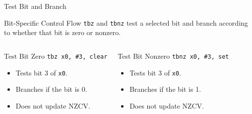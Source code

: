 \documentclass[aspectratio=169,11pt,t]{beamer}
\newcommand{\code}[1]{\texttt{#1}}
\begin{document}
\begin{frame}{Test Bit and Branch}
\begin{block}{Bit-Specific Control Flow}
\code{tbz} and \code{tbnz} test a selected bit and branch according to whether that bit is zero or nonzero.
\end{block}
\vspace{0.2cm}
\begin{columns}[T,onlytextwidth]
\begin{block}{Test Bit Zero}
\large
\hspace{1.1cm}\code{tbz x0, \#3, clear}
\normalsize
\begin{itemize}
\item Tests bit 3 of \code{x0}.
\item Branches if the bit is 0.
\item Does not update NZCV.
\end{itemize}
\end{block}
\begin{block}{Test Bit Nonzero}
\large
\hspace{1.0cm}\code{tbnz x0, \#3, set}
\normalsize
\begin{itemize}
\item Tests bit 3 of \code{x0}.
\item Branches if the bit is 1.
\item Does not update NZCV.
\end{itemize}
\end{block}
\end{columns}
\end{frame}



\end{document}
